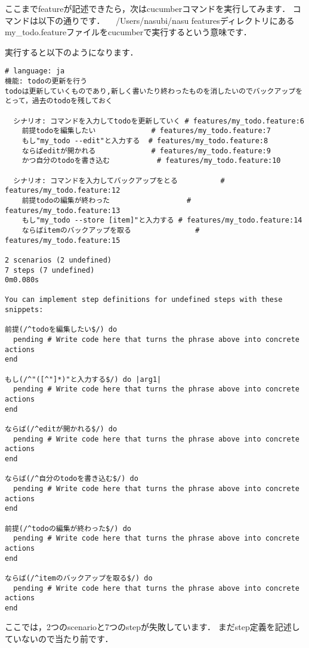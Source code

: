 ここまでfeatureが記述できたら，次はcucumberコマンドを実行してみます．
コマンドは以下の通りです．
　/Users/nasubi/nasu%
featuresディレクトリにあるmy\_todo.featureファイルをcucumberで実行するという意味です．

実行すると以下のようになります．
\begin{lstlisting}[basicstyle=\scriptsize]
# language: ja
機能: todoの更新を行う
todoは更新していくものであり,新しく書いたり終わったものを消したいのでバックアップをとって，過去のtodoを残しておく

  シナリオ: コマンドを入力してtodoを更新していく # features/my_todo.feature:6
    前提todoを編集したい             # features/my_todo.feature:7
    もし"my_todo --edit"と入力する  # features/my_todo.feature:8
    ならばeditが開かれる             # features/my_todo.feature:9
    かつ自分のtodoを書き込む           # features/my_todo.feature:10

  シナリオ: コマンドを入力してバックアップをとる          # features/my_todo.feature:12
    前提todoの編集が終わった                  # features/my_todo.feature:13
    もし"my_todo --store [item]"と入力する # features/my_todo.feature:14
    ならばitemのバックアップを取る               # features/my_todo.feature:15

2 scenarios (2 undefined)
7 steps (7 undefined)
0m0.080s

You can implement step definitions for undefined steps with these snippets:

前提(/^todoを編集したい$/) do
  pending # Write code here that turns the phrase above into concrete actions
end

もし(/^"([^"]*)"と入力する$/) do |arg1|
  pending # Write code here that turns the phrase above into concrete actions
end

ならば(/^editが開かれる$/) do
  pending # Write code here that turns the phrase above into concrete actions
end

ならば(/^自分のtodoを書き込む$/) do
  pending # Write code here that turns the phrase above into concrete actions
end

前提(/^todoの編集が終わった$/) do
  pending # Write code here that turns the phrase above into concrete actions
end

ならば(/^itemのバックアップを取る$/) do
  pending # Write code here that turns the phrase above into concrete actions
end
\end{lstlisting}
ここでは，2つのscenarioと7つのstepが失敗しています．
まだstep定義を記述していないので当たり前です．


